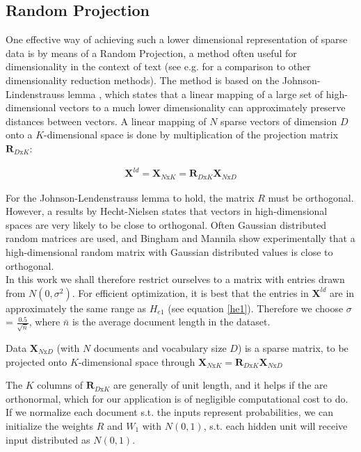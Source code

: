 \documentclass{report}
\begin{document}
\subsection{Random Projection}\label{RP}
One effective way of achieving such a lower dimensional representation of sparse data is by means of a Random Projection, a method often useful for dimensionality in the context of text (see e.g. \cite{bingham2001random} for a comparison to other dimensionality reduction methods). The method is based on the Johnson-Lindenstrauss lemma \cite{frankl1988johnson}, which states that a linear mapping of a large set of high-dimensional vectors to a much lower dimensionality can approximately preserve distances between vectors. A linear mapping of $N$ sparse vectors of dimension $D$ onto a $K$-dimensional space is done by multiplication of the projection matrix $\mathbf{R}_{D\text{x}K}$:

\begin{align}
\mathbf{X}^{ld} = \mathbf{X}_{N\text{x}K} = \mathbf{R}_{D\text{x}K}\mathbf{X}_{N\text{x}D}
\end{align}

 For the Johnson-Lendenstrauss lemma to hold, the matrix $R$ must be orthogonal. However, a results by Hecht-Nielsen \cite{hecht1994context} states that vectors in high-dimensional spaces are very likely to be close to orthogonal. Often Gaussian distributed random matrices are used, and Bingham  and Mannila \cite{bingham2001random} show experimentally that a high-dimensional random matrix with Gaussian distributed values is close to orthogonal. \\
In this work we shall therefore restrict ourselves to a matrix with entries drawn from $N(0,\sigma^2)$. For efficient optimization, it is best that the entries in $\mathbf{X}^{ld}$ are in approximately the same range as $H_{e1}$ (see equation \ref{he1}). Therefore we choose $\sigma$ = $\frac{0.5}{\sqrt{\bar{n}}}$, where $\bar{n}$ is the average document length in the dataset. 

Data $\mathbf{X}_{N\text{x}D}$ (with $N$ documents and vocabulary size $D$) is a sparse matrix, to be projected onto $K$-dimensional space through $\mathbf{X}_{N\text{x}K} = \mathbf{R}_{D\text{x}K}\mathbf{X}_{N\text{x}D}$

The $K$ columns of $\mathbf{R}_{D\text{x}K}$ are generally of unit length, and it helps if the are orthonormal, which for our application is of negligible computational cost to do. If we normalize each document s.t. the inputs represent probabilities, we can initialize the weights $R$ and $W_1$ with $N(0,1)$, s.t. each hidden unit will receive input distributed as $N(0,1)$. 
\end{document}
